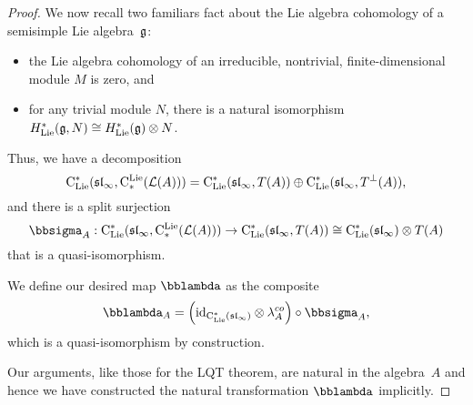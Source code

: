 \documentclass[11pt]{amsart}
\numberwithin{equation}{section}
\begin{document}
\begin{proof}
We now recall two familiars fact about the Lie algebra cohomology of a semisimple Lie algebra~$\mathfrak g$:
\begin{itemize}
\item the Lie algebra cohomology of an irreducible, nontrivial, finite-dimensional module $M$ is zero, and
\item for any trivial module $N$, there is a natural isomorphism $H^*_{\rm Lie}( \mathfrak g,N) \cong H^*_{\rm Lie}(\mathfrak g) \otimes N$.
\end{itemize}
Thus, we have a decomposition
\[
{\rm C}_{\rm Lie}^*(\frak{sl}_\infty,{\rm C}^{\rm Lie}_*(\mathcal L(A))) = {\rm C}_{\rm Lie}^*(\frak{sl}_\infty,T(A)) \oplus {\rm C}_{\rm Lie}^*(\frak{sl}_\infty,T^\perp(A)), 
\]
and there is a split surjection
\[
\bbsigma_A: \clies(\sl_\infty,\cliels(\cL(A))) \to \clies(\sl_\infty,T(A)) \cong \clies(\sl_\infty) \otimes T(A) 
\]
that is a quasi-isomorphism.

We define our desired map $\lqt$ as the composite
\[
\lqt_A = \left(\id_{\clies(\sl_\infty)} \otimes \lambda^{co}_A \right) \circ \bbsigma_A,
\]
which is a quasi-isomorphism by construction.

Our arguments, like those for the LQT theorem, are natural in the algebra~$A$ and hence we have constructed the natural transformation $\lqt$ implicitly.
\end{proof}

%
%
\end{document}
